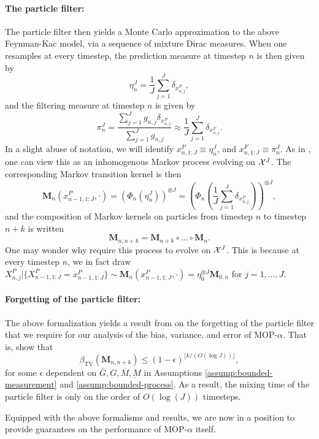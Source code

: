 \paragraph{\bf The particle filter:} The particle filter then yields a Monte Carlo approximation to the above Feynman-Kac model, via a sequence of mixture Dirac measures. When one resamples at every timestep, the prediction measure at timestep $n$ is then given by 
\begin{equation}
\eta_n^J = \frac{1}{J}\sum_{j=1}^J \delta_{x_{n,j}^P},
\end{equation}
and the filtering measure at timestep $n$ is given by
\begin{equation}
\pi_n^J = \frac{\sum_{j=1}^J g_{n,j} \delta_{x_{n,j}^P}}{\sum_{j=1}^J g_{n,j}} \approx \frac{1}{J} \sum_{j=1}^J \delta_{x_{n,j}^F}.
\end{equation}
In a slight abuse of notation, we will identify $x_{n, 1:J}^P \equiv \eta_n^J$, and $x_{n, 1:J}^F \equiv \pi_n^J$. 
As in \cite{karjalainen23}, one can view this as an inhomogenous Markov process evolving on ${\mathcal{X}}^{J}$. The corresponding Markov transition kernel is then 
\begin{equation}
\textbf{M}_n(x_{n-1, 1:J}^P, \cdot) = \left(\Phi_{n}\left(\eta_n^J\right)\right)^{\otimes J} = \left(\Phi_{n}\left(\frac{1}{J}\sum_{j=1}^J \delta_{x_{n,j}^P}\right)\right)^{\otimes J},
\end{equation}
and the composition of Markov kernels on particles from timestep $n$ to timestep $n+k$ is written 
\begin{equation}
\textbf{M}_{n, n+k} = \textbf{M}_{n+k}\circ ...\circ \textbf{M}_n.
\end{equation}
One may wonder why \cite{karjalainen23} require this process to evolve on ${\mathcal{X}}^{J}$. This is because at every timestep $n$, we in fact draw $X_{n, j}^P | \{X_{n-1, 1:J}^P = x_{n-1, 1:J}^P\} \sim \textbf{M}_n(x_{n-1, 1:J}^P, \cdot) = \eta_0^{\otimes J} \textbf{M}_{0,n}$ for $j=1,...,J$. 

\paragraph{\bf Forgetting of the particle filter:} 
The above formalization yields a result from \cite{karjalainen23} on the forgetting of the particle filter that we require for our analysis of the bias, variance, and error of MOP-$\alpha$.  
That is, \cite{karjalainen23} show that
\begin{equation}
\beta_{\mathrm{TV}}\left(\mathbf{M}_{n, n+k}\right) \leq(1-\epsilon)^{\lfloor k /(O(\log J))\rfloor},
\end{equation}
for some $\epsilon$ dependent on $\bar{G}, \underbar{G}, \bar{M}, \underbar{M}$ in Assumptions \ref{assump:bounded-measurement} and \ref{assump:bounded-process}. As a result, the mixing time of the particle filter is only on the order of $O(\log(J))$ timesteps. 


\vspace{3mm}

Equipped with the above formalisms and results, we are now in a position to provide guarantees on the performance of MOP-$\alpha$ itself. 
